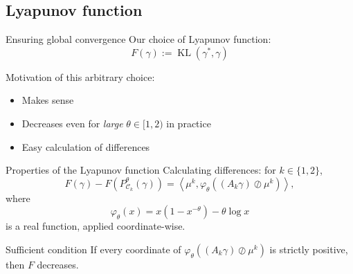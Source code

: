 \documentclass[compress]{beamer}
\newcommand{\scal}[2]{\left\langle #1 , #2 \right\rangle}
\DeclareMathOperator{\Ccal}{\mathcal{C}}
\DeclareMathOperator{\KL}{KL}
\begin{document}
\subsection{Lyapunov function}
\begin{frame}{Ensuring global convergence}
	Our choice of Lyapunov function:
	\[F(\gamma) := \KL(\gamma^*,\gamma)\]
	\pause
	
	Motivation of this arbitrary choice:
	\begin{itemize}
		\item Makes sense
		\item Decreases even for \emph{large} $\theta \in [1,2)$ in practice %
		\item Easy calculation of differences %
	\end{itemize}
	
\end{frame}

\begin{frame}{Properties of the Lyapunov function}
Calculating differences: for $k \in \{1,2\}$,
\begin{equation*} \label{eq:kl_diff_scal}
F(\gamma) - F(P^\theta_{\Ccal_k}(\gamma)) = 
\scal{\mu^k}{\varphi_\theta \left((A_k \gamma) \oslash \mu^k \right)},
\end{equation*}
where
\begin{equation*}
\varphi_\theta(x) = x(1-x^{-\theta}) - \theta \log x
\end{equation*}
is a real function, applied coordinate-wise.
\pause
\begin{block}{Sufficient condition}
	If every coordinate of $\varphi_\theta \left((A_k \gamma) \oslash \mu^k \right)$ is strictly positive, then $F$ decreases.
\end{block}
\end{frame}
\end{document}
